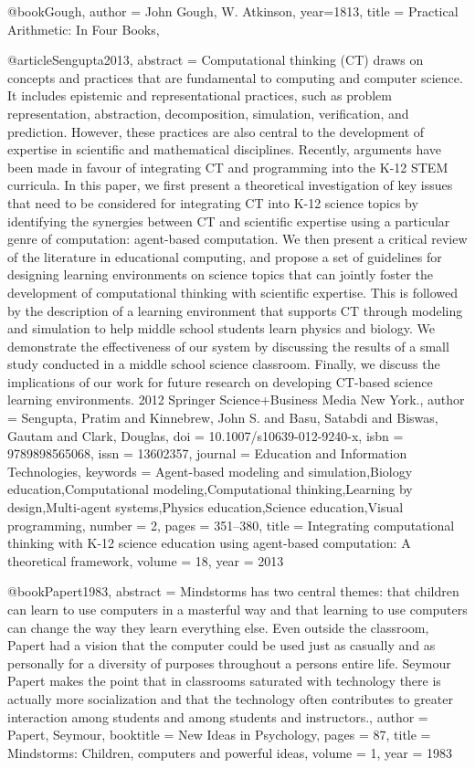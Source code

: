 @book{Gough,
	author = {John Gough, W. Atkinson},
	year={1813},
	title = {Practical Arithmetic: In Four Books},
}

@article{Sengupta2013,
abstract = {Computational thinking (CT) draws on concepts and practices that are fundamental to computing and computer science. It includes epistemic and representational practices, such as problem representation, abstraction, decomposition, simulation, verification, and prediction. However, these practices are also central to the development of expertise in scientific and mathematical disciplines. Recently, arguments have been made in favour of integrating CT and programming into the K-12 STEM curricula. In this paper, we first present a theoretical investigation of key issues that need to be considered for integrating CT into K-12 science topics by identifying the synergies between CT and scientific expertise using a particular genre of computation: agent-based computation. We then present a critical review of the literature in educational computing, and propose a set of guidelines for designing learning environments on science topics that can jointly foster the development of computational thinking with scientific expertise. This is followed by the description of a learning environment that supports CT through modeling and simulation to help middle school students learn physics and biology. We demonstrate the effectiveness of our system by discussing the results of a small study conducted in a middle school science classroom. Finally, we discuss the implications of our work for future research on developing CT-based science learning environments. {\textcopyright} 2012 Springer Science+Business Media New York.},
author = {Sengupta, Pratim and Kinnebrew, John S. and Basu, Satabdi and Biswas, Gautam and Clark, Douglas},
doi = {10.1007/s10639-012-9240-x},
isbn = {9789898565068},
issn = {13602357},
journal = {Education and Information Technologies},
keywords = {Agent-based modeling and simulation,Biology education,Computational modeling,Computational thinking,Learning by design,Multi-agent systems,Physics education,Science education,Visual programming},
number = {2},
pages = {351--380},
title = {{Integrating computational thinking with K-12 science education using agent-based computation: A theoretical framework}},
volume = {18},
year = {2013}
}


@book{Papert1983,
	abstract = {Mindstorms has two central themes: that children can learn to use computers in a masterful way and that learning to use computers can change the way they learn everything else. Even outside the classroom, Papert had a vision that the computer could be used just as casually and as personally for a diversity of purposes throughout a persons entire life. Seymour Papert makes the point that in classrooms saturated with technology there is actually more socialization and that the technology often contributes to greater interaction among students and among students and instructors.},
	author = {Papert, Seymour},
	booktitle = {New Ideas in Psychology},
	pages = {87},
	title = {{Mindstorms: Children, computers and powerful ideas}},
	volume = {1},
	year = {1983}
}

